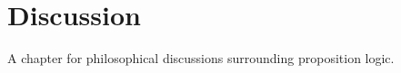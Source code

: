 \documentclass[../../../include/open-logic-chapter]{subfiles}
\begin{document}
\chapter{Discussion}

\begin{editorial}
  A chapter for philosophical discussions surrounding proposition logic.
\end{editorial}



\OLEndChapterHook
\end{document}
